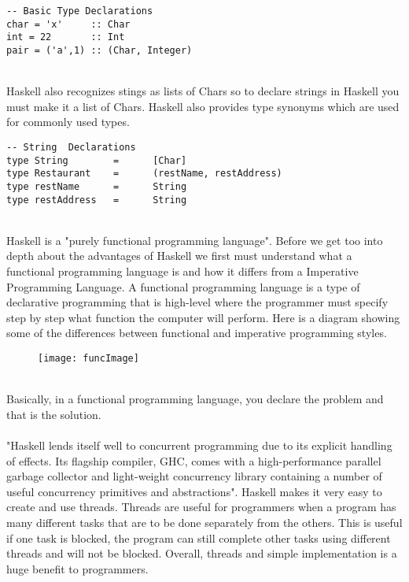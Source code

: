 \documentclass{article}
\begin{document}
\begin{lstlisting}
-- Basic Type Declarations
char = 'x'     :: Char
int = 22       :: Int
pair = ('a',1) :: (Char, Integer)
\end{lstlisting}
\\
Haskell also recognizes stings as lists of Chars so to declare strings in Haskell you must make it a list of Chars. Haskell also provides type synonyms which are used for commonly used types.
\\
\begin{lstlisting}
-- String  Declarations
type String        =      [Char]
type Restaurant    =      (restName, restAddress)
type restName      =      String
type restAddress   =      String
\end{lstlisting}
\\
Haskell is a "purely functional programming language". Before we get too into depth about the advantages of Haskell we first must understand what a functional programming language is and how it differs from a Imperative Programming Language. A functional programming language is a type of declarative programming that is high-level where the programmer must specify step by step what function the computer will perform. Here is a diagram showing some of the differences between functional and imperative programming styles.
\\
\begin{figure}[H]
    \centering
    \texttt{[image: funcImage]}
\end{figure}

\\
Basically, in a functional programming language, you declare the problem and that is the solution.
\\
\\

"Haskell lends itself well to concurrent programming due to its explicit handling of effects. Its flagship compiler, GHC, comes with a high-performance parallel garbage collector and light-weight concurrency library containing a number of useful concurrency primitives and abstractions". Haskell makes it very easy to create and use threads. Threads are useful for programmers when a program has many different tasks that are to be done separately from the others. This is useful if one task is blocked, the program can still complete other tasks using different threads and will not be blocked. Overall, threads and simple implementation is a huge benefit to programmers.
\end{document}
